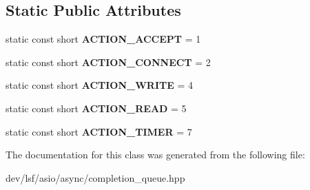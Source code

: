 \subsection*{Static Public Attributes}
\begin{DoxyCompactItemize}
\item 
\hypertarget{classlsf_1_1asio_1_1async_1_1CompletionQueue_ae7d7b1638ec7db244e23c823e8bb97ad}{
static const short {\bfseries ACTION\_\-ACCEPT} = 1}
\label{classlsf_1_1asio_1_1async_1_1CompletionQueue_ae7d7b1638ec7db244e23c823e8bb97ad}

\item 
\hypertarget{classlsf_1_1asio_1_1async_1_1CompletionQueue_ac4f440fabb8c4b16aa9cb63c13bc0606}{
static const short {\bfseries ACTION\_\-CONNECT} = 2}
\label{classlsf_1_1asio_1_1async_1_1CompletionQueue_ac4f440fabb8c4b16aa9cb63c13bc0606}

\item 
\hypertarget{classlsf_1_1asio_1_1async_1_1CompletionQueue_a489ff297298a52e2b72d98d74d354b0e}{
static const short {\bfseries ACTION\_\-WRITE} = 4}
\label{classlsf_1_1asio_1_1async_1_1CompletionQueue_a489ff297298a52e2b72d98d74d354b0e}

\item 
\hypertarget{classlsf_1_1asio_1_1async_1_1CompletionQueue_aff11306f9975c207e3f9cb75fc748250}{
static const short {\bfseries ACTION\_\-READ} = 5}
\label{classlsf_1_1asio_1_1async_1_1CompletionQueue_aff11306f9975c207e3f9cb75fc748250}

\item 
\hypertarget{classlsf_1_1asio_1_1async_1_1CompletionQueue_a92ef9285b9611386635c0a65edbc36d0}{
static const short {\bfseries ACTION\_\-TIMER} = 7}
\label{classlsf_1_1asio_1_1async_1_1CompletionQueue_a92ef9285b9611386635c0a65edbc36d0}

\end{DoxyCompactItemize}


The documentation for this class was generated from the following file:\begin{DoxyCompactItemize}
\item 
dev/lsf/asio/async/completion\_\-queue.hpp\end{DoxyCompactItemize}
